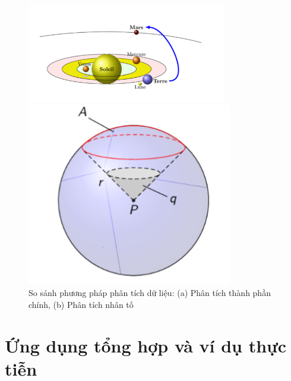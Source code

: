 \begin{figure}[h]
    \centering
    \begin{minipage}{0.45\textwidth}
        \centering
        \includegraphics[width=\textwidth]{../../assets/images/figure-2.png}
    \end{minipage}
    \hfill
    \begin{minipage}{0.45\textwidth}
        \centering
        \includegraphics[width=0.8\textwidth]{../../assets/images/figure-3.png}
    \end{minipage}
    \caption{So sánh phương pháp phân tích dữ liệu: (a) Phân tích thành phần chính, (b) Phân tích nhân tố}
    \label{fig:comparison_analysis_methods}
\end{figure}

\section{Ứng dụng tổng hợp và ví dụ thực tiễn}

